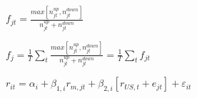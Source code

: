 

$f_{jt} = \frac{max[n_{jt}^{up}, n_{jt}^{down}]}{n_{jt}^{up} + n^{down}_{jt}}$

$f_j = \frac{1}{T} \displaystyle\sum_t \frac{max[n_{jt}^{up}, n_{jt}^{down}]}{n_{jt}^{up} + n_{jt}^{down}} = \frac{1}{T} \displaystyle\sum_t f_{jt}$

$r_{it} = \alpha_i + \beta_{1, i} r_{m, jt} + \beta_{2, i} [r_{US, t} + e_{jt}] + \varepsilon_{it}$


